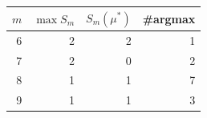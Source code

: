 \small
\setlength{\tabcolsep}{6pt}
\renewcommand{\arraystretch}{1.15}
\begin{tabular}{r r r r}
\toprule
$m$ & $\max S_m$ & $S_m(\mu^\ast)$ & \#argmax \\
\midrule
6 & 2 & 2 & 1 \\
7 & 2 & 0 & 2 \\
8 & 1 & 1 & 7 \\
9 & 1 & 1 & 3 \\
\bottomrule
\end{tabular}


